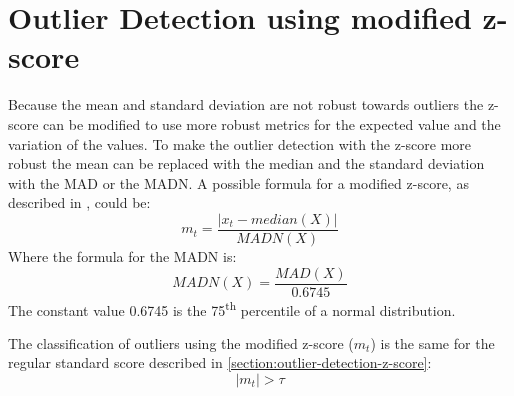 \section{Outlier Detection using modified z-score}
Because the mean and standard deviation are not robust towards outliers the z-score can be modified to use more robust metrics for the expected value and the variation of the values. To make the outlier detection with the z-score more robust the mean can be replaced with the median and the standard deviation with the \ac{MAD} or the \ac{MADN}. A possible formula for a modified z-score, as described in \cite{baeOutlierDetectionSmoothing2019}, could be:
\begin{equation*}
  m_t = \frac{|x_t - median(X)|}{MADN(X)}
\end{equation*}
Where the formula for the \ac{MADN} is:
\begin{equation*}
  MADN(X) = \frac{MAD(X)}{0.6745}
\end{equation*}
The constant value 0.6745 is the 75\textsuperscript{th} percentile of a normal distribution.
\cite{baeOutlierDetectionSmoothing2019}
\par
The classification of outliers using the modified z-score ($m_t$) is the same for the regular standard score described in \autoref{section:outlier-detection-z-score}:
\begin{equation*}
  |m_t| > \tau
\end{equation*}



